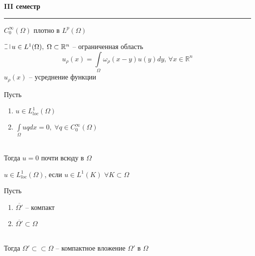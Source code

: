 
\begin{center}
  {\large \bf III семестр}
  \rule{\textwidth}{1pt}
\end{center}

\begin{utv}
  $C_{0}^{\infty}(\Omega)$ плотно в $L^p(\Omega)$
\end{utv}

\begin{definition}[Усреднение]
$\letus \, u \in L^1(\Omega), \; \Omega \subset \mathbb{R}^n$ -- ограниченная область\\
$$u_\rho(x) = \int\limits_{\Omega} \omega_\rho(x-y)u(y)dy, \, \forall x \in \mathbb{R}^n$$
$u_\rho(x)$ -- усреднение функции
\end{definition}

\begin{lemma}
 Пусть \begin{minipage}[t]{0.8\linewidth}\begin{enumerate}[itemsep=1mm]
    \item $u \in L^1_{loc}(\Omega)$
    \item $\int\limits_\Omega uq dx = 0, \; \forall q \in C_0^\infty(\Omega)$
    \end{enumerate}\end{minipage}\\
  Тогда $u = 0$ почти всюду в $\Omega$
\end{lemma}

\begin{definition}
  $u \in L^1_{loc}(\Omega)$, если $u \in L^1(K)$ $\forall K \subset \Omega$
\end{definition}

\begin{definition}
  Пусть \begin{minipage}[t]{0.8\linewidth}\begin{enumerate}[itemsep=1mm]
    \item $\overline{\Omega'}$ -- компакт
    \item $\overline{\Omega'} \subset \Omega$
  \end{enumerate}\end{minipage}\\

  \noindent Тогда $\Omega' \subset\subset \Omega$ -- компактное вложение $\Omega'$ в $\Omega$
\end{definition}


